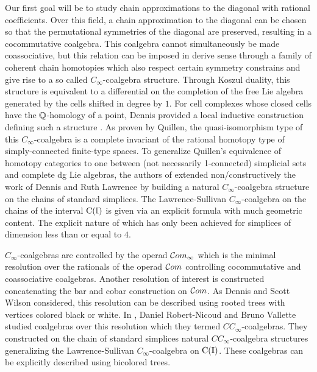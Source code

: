 Our first goal will be to study chain approximations to the diagonal with rational coefficients.
Over this field, a chain approximation to the diagonal can be chosen so that the permutational symmetries of the diagonal are preserved, resulting in a cocommutative coalgebra.
This coalgebra cannot simultaneously be made coassociative, but
this relation can be imposed in derive sense through a family of coherent chain homotopies which also respect certain symmetry constrains and give rise to a so called $C_\infty$-coalgebra structure.
Through Koszul duality, this structure is equivalent to a differential on the completion of the free Lie algebra generated by the cells shifted in degree by $1$.
For cell complexes whose closed cells have the $\mathbb{Q}$-homology of a point, Dennis provided a local inductive construction defining such a structure \cite{sullivan2007appendix}.
As proven by Quillen, the quasi-isomorphism type of this $C_\infty$-coalgebra is a complete invariant of the rational homotopy type of simply-connected finite-type spaces.
To generalize Quillen's equivalence of homotopy categories to one between (not necessarily 1-connected) simplicial sets and complete dg Lie algebras, the authors of \cite{buijs2020liemodels} extended non\-/constructively the work of Dennis and Ruth Lawrence \cite{lawrence2014interval} by building a natural $C_\infty$-coalgebra structure on the chains of standard simplices.
The Lawrence-Sullivan $C_\infty$-coalgebra on the chains of the interval $\operatorname{C}(\mathbb{I})$ is given via an explicit formula with much geometric content.
The explicit nature of which has only been achieved for simplices of dimension less than or equal to $4$.

$C_\infty$-coalgebras are controlled by the operad $\mathcal{C}om_\infty$ which is the minimal resolution over the rationals of the operad $\mathcal{C}om$ controlling cocommutative and coassociative coalgebras.
Another resolution of interest is constructed concatenating the bar and cobar construction on $\mathcal{C}om$.
As Dennis and Scott Wilson considered, this resolution can be described using rooted trees with vertices colored black or white.
In \cite{bibid}, Daniel Robert-Nicoud and Bruno Vallette studied coalgebras over this resolution which they termed $CC_\infty$-coalgebras.
They constructed on the chain of standard simplices natural $CC_\infty$-coalgebra structures generalizing the Lawrence-Sullivan $C_\infty$-coalgebra on $\operatorname{C}(\mathbb{I})$. These coalgebras can be explicitly described using bicolored trees.

